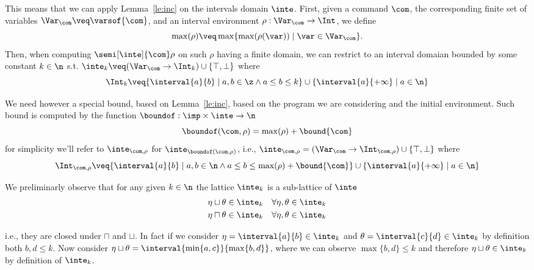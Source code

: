 This means that we can apply Lemma~\ref{le:inc} on the intervals
domain \(\inte\).  First, given a command \(\com\), the corresponding
finite set of variables \(\Var_{\com} \veq \varsof{\com}\), and
an interval environment \(\rho : \Var_{\com} \to \Int\), we define
\[\max(\rho) \veq \max \{ \max(\rho(\var)) \mid \var \in \Var_{\com}
  \}.\]
% 
Then, when computing \(\semi[\inte]{\com} \rho\) on such \(\rho\)
having a finite domain, we can restrict to an interval domaian bounded
by some constant \(k\in\n\) s.t.
\(\inte_k \veq (\Var_{\com} \to \Int_k) \cup \{\top, \bot\}\) where
\begin{equation*}
  \Int_k \veq \{ \interval{a}{b} \mid a, b \in \z \land
  a \leq b \leq k\} \cup \{\interval{a}{+\infty} \mid a \in\n\}
\end{equation*}

We need however a special bound, based on Lemma~\ref{le:inc}, based on
the program we are considering and the initial environment. Such bound
is computed by the function \({\boundof : \imp \times \inte \to \n}\)
\begin{equation*}
  \boundof(\com, \rho) = \max(\rho) + \bound{\com}
\end{equation*}
for simplicity we'll refer to \(\inte_{\com,\rho}\) for
\(\inte_{\boundof(\com,\rho)}\), i.e.,
\({\inte_{\com,\rho} = (\Var_{\com} \to \Int_{\com,\rho}) \cup \{
  \top, \bot \}}\) where
\begin{equation*}
  \Int_{\com,\rho} \veq \{ \interval{a}{b} \mid a, b \in \n \land
  a \leq b \leq \max(\rho) + \bound{\com}\} \cup \{\interval{a}{+\infty} \mid a \in\n\}
\end{equation*}

We preliminarly observe that for any given \(k\in\n\) the lattice
\(\inte_k\) is a sub-lattice of \(\inte\)
\begin{align*}
  \eta \sqcup \theta & \in \inte_k & \forall \eta,\theta \in \inte_k \\
  \eta \sqcap \theta & \in \inte_k & \forall \eta,\theta \in \inte_k
\end{align*}

i.e., they are closed under \(\sqcap\) and \(\sqcup\). In fact if we
consider \({\eta = \interval{a}{b} \in \inte_k}\) and
\({\theta = \interval{c}{d} \in \inte_k}\) by definition both
\(b,d \leq k\). Now consider
\({\eta \sqcup \theta = \interval{\min\{a,c\}}{\max\{b,d\}}}\), where
we can observe \(\max\{b,d\} \leq k\) and therefore
\({\eta \sqcup \theta \in \inte_k}\) by definition of
\(\inte_k\).

